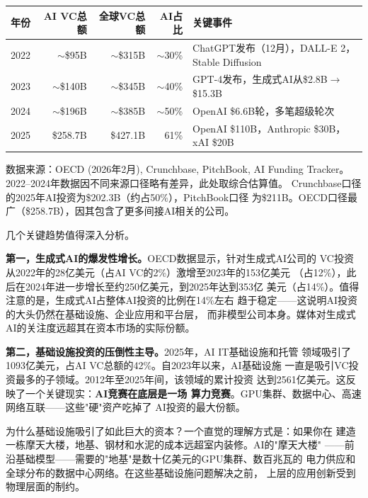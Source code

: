\begin{keybox}[全球AI风险投资年度总览（2022--2025）]
\small
\begin{tabularx}{\textwidth}{l r r r X}
\toprule
\rowcolor{figLightGray}
\textbf{年份} & \textbf{AI VC总额} & \textbf{全球VC总额}
  & \textbf{AI占比} & \textbf{关键事件} \\
\midrule
2022  & $\sim$\$95B   & $\sim$\$315B  & $\sim$30\%
  & ChatGPT发布（12月），DALL-E 2，Stable Diffusion \\
2023  & $\sim$\$140B  & $\sim$\$345B  & $\sim$40\%
  & GPT-4发布，生成式AI从\$2.8B$\to$\$15.3B \\
2024  & $\sim$\$196B  & $\sim$\$385B  & $\sim$50\%
  & OpenAI \$6.6B轮，多笔超级轮次 \\
2025  & \$258.7B      & \$427.1B      & 61\%
  & OpenAI \$110B，Anthropic \$30B，xAI \$20B \\
\bottomrule
\end{tabularx}

\medskip
\noindent 数据来源：OECD (2026年2月), Crunchbase, PitchBook, AI Funding
Tracker。2022--2024年数据因不同来源口径略有差异，此处取综合估算值。
Crunchbase口径的2025年AI投资为\$202.3B（约占50\%），PitchBook口径
为\$211B。OECD口径最广（\$258.7B），因其包含了更多间接AI相关的公司。
\end{keybox}

几个关键趋势值得深入分析。

\textbf{第一，生成式AI的爆发性增长。}OECD数据显示，针对生成式AI公司的
VC投资从2022年的28亿美元（占AI VC的2\%）激增至2023年的153亿美元
（占12\%），此后在2024年进一步增长至约250亿美元，到2025年达到353亿
美元（占14\%）。值得注意的是，生成式AI占整体AI投资的比例在14\%左右
趋于稳定——这说明AI投资的大头仍然在基础设施、企业应用和平台层，
而非模型公司本身。媒体对生成式AI的关注度远超其在资本市场的实际份额。

\textbf{第二，基础设施投资的压倒性主导。}2025年，AI IT基础设施和托管
领域吸引了1093亿美元，占AI VC总额的42\%。自2023年以来，AI基础设施
一直是吸引VC投资最多的子领域。2012年至2025年间，该领域的累计投资
达到2561亿美元。这反映了一个关键现实：\textbf{AI竞赛在底层是一场
算力竞赛}。GPU集群、数据中心、高速网络互联——这些"硬"资产吃掉了
AI投资的最大份额。

为什么基础设施吸引了如此巨大的资本？一个直觉的理解方式是：如果你在
建造一栋摩天大楼，地基、钢材和水泥的成本远超室内装修。AI的"摩天大楼"
——前沿基础模型——需要的"地基"是数十亿美元的GPU集群、数百兆瓦的
电力供应和全球分布的数据中心网络。在这些基础设施问题解决之前，
上层的应用创新受到物理层面的制约。

